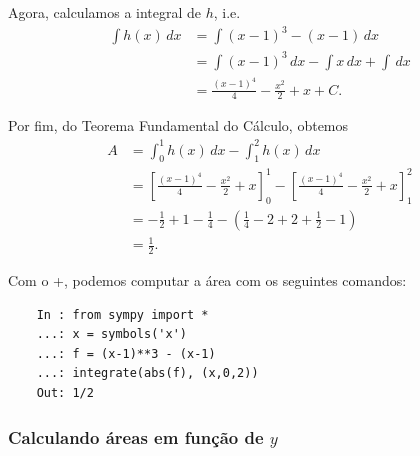 \begin{ex}
  Agora, calculamos a integral de $h$, i.e.
  \begin{align}
    \int h(x)\,dx &= \int (x-1)^3-(x-1)\,dx \\
                  &= \int (x-1)^3\,dx - \int x\,dx + \int\,dx \\
                  &= \frac{(x-1)^4}{4} - \frac{x^2}{2} + x + C.
  \end{align}

  Por fim, do Teorema Fundamental do Cálculo, obtemos
  \begin{align}
    A &= \int_0^1 h(x)\,dx - \int_1^2 h(x)\,dx \\
      &= \left[\frac{(x-1)^4}{4} - \frac{x^2}{2} + x\right]_0^1 - \left[\frac{(x-1)^4}{4} - \frac{x^2}{2} + x\right]_1^2 \\
      &= -\frac{1}{2}+1-\frac{1}{4}-\left(\frac{1}{4}-2+2+\frac{1}{2}-1\right) \\
      &= \frac{1}{2}.
  \end{align}
  
  \ifispython
  Com o {\python}+{\sympy}, podemos computar a área com os seguintes comandos:
  \begin{lstlisting}
    In : from sympy import *
    ...: x = symbols('x')
    ...: f = (x-1)**3 - (x-1)
    ...: integrate(abs(f), (x,0,2))
    Out: 1/2
  \end{lstlisting}
  \fi  
\end{ex}

\subsubsection{Calculando áreas em função de $y$}

